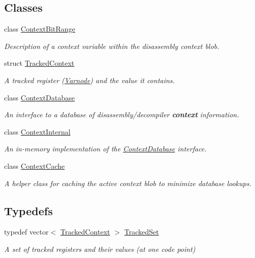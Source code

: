 \subsection*{Classes}
\begin{DoxyCompactItemize}
\item 
class \mbox{\hyperlink{class_context_bit_range}{Context\+Bit\+Range}}
\begin{DoxyCompactList}\small\item\em Description of a context variable within the disassembly context {\itshape blob}. \end{DoxyCompactList}\item 
struct \mbox{\hyperlink{struct_tracked_context}{Tracked\+Context}}
\begin{DoxyCompactList}\small\item\em A tracked register (\mbox{\hyperlink{class_varnode}{Varnode}}) and the value it contains. \end{DoxyCompactList}\item 
class \mbox{\hyperlink{class_context_database}{Context\+Database}}
\begin{DoxyCompactList}\small\item\em An interface to a database of disassembly/decompiler {\bfseries{context}} information. \end{DoxyCompactList}\item 
class \mbox{\hyperlink{class_context_internal}{Context\+Internal}}
\begin{DoxyCompactList}\small\item\em An in-\/memory implementation of the \mbox{\hyperlink{class_context_database}{Context\+Database}} interface. \end{DoxyCompactList}\item 
class \mbox{\hyperlink{class_context_cache}{Context\+Cache}}
\begin{DoxyCompactList}\small\item\em A helper class for caching the active context blob to minimize database lookups. \end{DoxyCompactList}\end{DoxyCompactItemize}
\subsection*{Typedefs}
\begin{DoxyCompactItemize}
\item 
typedef vector$<$ \mbox{\hyperlink{struct_tracked_context}{Tracked\+Context}} $>$ \mbox{\hyperlink{globalcontext_8hh_a7559d2c55c5d12fbbaf0418733b62438}{Tracked\+Set}}
\begin{DoxyCompactList}\small\item\em A set of tracked registers and their values (at one code point) \end{DoxyCompactList}\end{DoxyCompactItemize}


